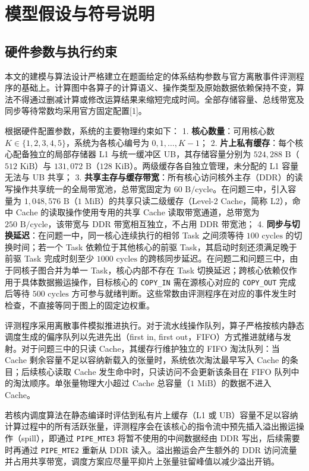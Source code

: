 \documentclass[anonymous,notoc]{gmcm2026}
\begin{document}
\section{模型假设与符号说明}

\subsection{硬件参数与执行约束}

本文的建模与算法设计严格建立在题面给定的体系结构参数与官方离散事件评测程序的基础上。计算图中各算子的计算语义、操作类型及原始数据依赖保持不变，算法不得通过删减计算或修改运算结果来缩短完成时间。全部存储容量、总线带宽及同步等待常数均采用官方固定配置{[}1{]}。

根据硬件配置参数，系统的主要物理约束如下： 1. \textbf{核心数量}：可用核心数 \(K \in \{1, 2, 3, 4, 5\}\)，系统为各核心编号为 \(0, 1, \dots, K-1\)； 2. \textbf{片上私有缓存}：每个核心配备独立的局部存储器 L1 与统一缓冲区 UB，其存储容量分别为 \(524{,}288\text{ B}\)（\(512\text{ KiB}\)）与 \(131{,}072\text{ B}\)（\(128\text{ KiB}\)）。两级缓存各自独立管理，未分配的 L1 容量无法与 UB 共享； 3. \textbf{共享主存与缓存带宽}：所有核心访问核外主存（DDR）的读写操作共享统一的全局带宽池，总带宽固定为 \(60\text{ B/cycle}\)。在问题三中，引入容量为 \(1{,}048{,}576\text{ B}\)（\(1\text{ MiB}\)）的共享只读二级缓存（Level-2 Cache，简称 L2），命中 Cache 的读取操作使用专用的共享 Cache 读取带宽通道，总带宽为 \(250\text{ B/cycle}\)，该带宽与 DDR 带宽相互独立，不占用 DDR 带宽池； 4. \textbf{同步与切换延迟}：在问题一中，同一核心连续执行的相邻 Task 之间须等待 \(100\text{ cycles}\) 的切换时间；若一个 Task 依赖位于其他核心的前驱 Task，其启动时刻还须满足晚于前驱 Task 完成时刻至少 \(1000\text{ cycles}\) 的跨核同步延迟。在问题二和问题三中，由于同核子图合并为单一 Task，核心内部不存在 Task 切换延迟；跨核心依赖仅作用于具体数据搬运操作，目标核心的 \texttt{COPY\_IN} 需在源核心对应的 \texttt{COPY\_OUT} 完成后等待 \(500\text{ cycles}\) 方可参与就绪判断。这些常数由评测程序在对应的事件发生时检查，不直接等同于图上的固定边权重。

评测程序采用离散事件模拟推进执行。对于流水线操作队列，算子严格按核内静态调度生成的偏序队列以先进先出（first in, first out，FIFO）方式推进就绪与发射。对于问题三中的只读 Cache，其缓存行维护独立的 FIFO 淘汰队列：当 Cache 剩余容量不足以容纳新载入的张量时，系统依次淘汰最早写入 Cache 的条目；后续核心读取 Cache 发生命中时，只读访问不会更新该条目在 FIFO 队列中的淘汰顺序。单张量物理大小超过 Cache 总容量（\(1\text{ MiB}\)）的数据不进入 Cache。

若核内调度算法在静态编译时评估到私有片上缓存（L1 或 UB）容量不足以容纳计算过程中的所有活跃张量，评测程序会在该核心的指令流中预先插入溢出搬运操作（spill），即通过 \texttt{PIPE\_MTE3} 将暂不使用的中间数据经由 DDR 写出，后续需要时再通过 \texttt{PIPE\_MTE2} 重新从 DDR 读入。溢出搬运会产生额外的 DDR 访问流量并占用共享带宽，调度方案应尽量平抑片上张量驻留峰值以减少溢出开销。
\end{document}
